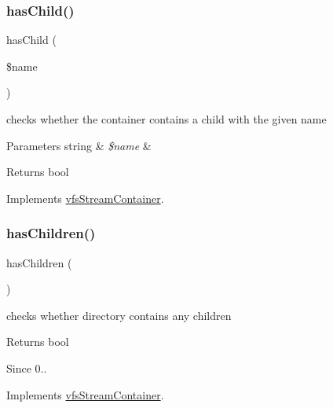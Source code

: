 \subsubsection{\texorpdfstring{has\+Child()}{hasChild()}}
{\footnotesize\ttfamily has\+Child (\begin{DoxyParamCaption}\item[{}]{\$name }\end{DoxyParamCaption})}

checks whether the container contains a child with the given name


\begin{DoxyParams}[1]{Parameters}
string & {\em \$name} & \\
\hline
\end{DoxyParams}
\begin{DoxyReturn}{Returns}
bool 
\end{DoxyReturn}


Implements \mbox{\hyperlink{interfaceorg_1_1bovigo_1_1vfs_1_1vfs_stream_container_a55594af16e4f3167cfd8b6706778eb04}{vfs\+Stream\+Container}}.

\mbox{\label{classorg_1_1bovigo_1_1vfs_1_1vfs_stream_directory_a1332d27ba1ecefa899e393e83309735e}} 
\subsubsection{\texorpdfstring{has\+Children()}{hasChildren()}}
{\footnotesize\ttfamily has\+Children (\begin{DoxyParamCaption}{ }\end{DoxyParamCaption})}

checks whether directory contains any children

\begin{DoxyReturn}{Returns}
bool 
\end{DoxyReturn}
\begin{DoxySince}{Since}
0.. 
\end{DoxySince}


Implements \mbox{\hyperlink{interfaceorg_1_1bovigo_1_1vfs_1_1vfs_stream_container_a1332d27ba1ecefa899e393e83309735e}{vfs\+Stream\+Container}}.

